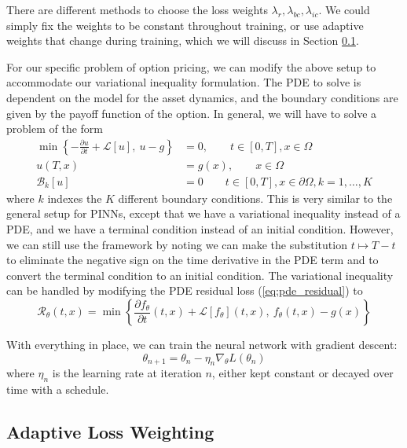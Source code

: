 There are different methods to choose the loss weights $\lambda_r, \lambda_{bc}, \lambda_{ic}$. We could simply fix the weights to be constant throughout training, or use adaptive weights that change during training, which we will discuss in Section \ref{sec:adaptive_loss_weighting}.

For our specific problem of option pricing, we can modify the above setup to accommodate our variational inequality formulation. The PDE to solve is dependent on the model for the asset dynamics, and the boundary conditions are given by the payoff function of the option. In general, we will have to solve a problem of the form
\begin{align}
    \min\left\{ -\frac{\partial u}{\partial t} + \mathcal L[u], \: u - g \right\} &= 0, \qquad t \in [0, T], x \in \Omega \label{eq:pinn_pde}\\
    u(T, x) &= g(x), \qquad x \in \Omega \label{eq:pinn_terminal}\\
    \mathcal B_k[u] &= 0 \qquad t \in [0, T], x \in \partial \Omega, k=1, \dots, K \label{eq:pinn_boundary}
\end{align}
where $k$ indexes the $K$ different boundary conditions. This is very similar to the general setup for PINNs, except that we have a variational inequality instead of a PDE, and we have a terminal condition instead of an initial condition. However, we can still use the framework by noting we can make the substitution $t \mapsto T-t$ to eliminate the negative sign on the time derivative in the PDE term and to convert the terminal condition to an initial condition. The variational inequality can be handled by modifying the PDE residual loss (\ref{eq:pde_residual}) to
\begin{equation}
    \mathcal R_\theta(t, x) = \min\left\{\frac{\partial f_\theta}{\partial t}(t, x) + \mathcal L[f_\theta](t, x), \: f_\theta(t, x) - g(x) \right\}
\end{equation}

With everything in place, we can train the neural network with gradient descent:
\begin{equation}
    \theta_{n+1} = \theta_n - \eta_n \nabla_\theta L(\theta_n)
\end{equation}
where $\eta_n$ is the learning rate at iteration $n$, either kept constant or decayed over time with a schedule.

\subsection{Adaptive Loss Weighting}
\label{sec:adaptive_loss_weighting}

